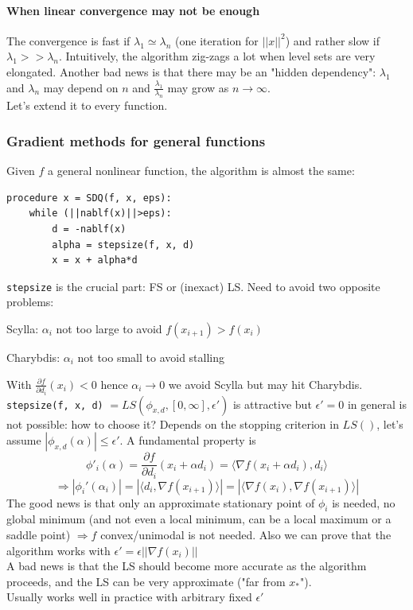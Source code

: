 \documentclass[10pt]{report}
\begin{document}
\paragraph{When linear convergence may not be enough} The convergence is fast if $\lambda_1\simeq \lambda_n$ (one iteration for $||x||^2$) and rather slow if $\lambda_1 >> \lambda_n$. Intuitively, the algorithm zig-zags a lot when level sets are very elongated. Another bad news is that there may be an "hidden dependency": $\lambda_1$ and $\lambda_n$ may depend on $n$ and $\frac{\lambda_1}{\lambda_n}$ may grow as $n\rightarrow\infty$.\\
Let's extend it to every function.
\subsubsection{Gradient methods for general functions}
Given $f$ a general nonlinear function, the algorithm is almost the same:
\begin{lstlisting}[style=myPython]
procedure x = SDQ(f, x, eps):
	while (||nablf(x)||>eps):
		d = -nablf(x)
		alpha = stepsize(f, x, d)
		x = x + alpha*d
\end{lstlisting}
\texttt{stepsize} is the crucial part: FS or (inexact) LS. Need to avoid two opposite problems:
\begin{list}{}{}
	\item Scylla: $\alpha_i$ not too large to avoid $f(x_{i+1}) > f(x_i)$
	\item Charybdis: $\alpha_i$ not too small to avoid stalling
\end{list}
With $\frac{\partial f}{\partial d_i}(x_i)<0$ hence $\alpha_i\rightarrow 0$ we avoid Scylla but may hit Charybdis.\\
\texttt{stepsize(f, x, d)} $= LS(\phi_{x,d}, [0,\infty], \epsilon')$ is attractive but $\epsilon' = 0$ in general is not possible: how to choose it? Depends on the stopping criterion in $LS()$, let's assume $|\phi_{x,d}(\alpha)| \leq \epsilon'$. A fundamental property is $$\phi'_i(\alpha) = \frac{\partial f}{\partial d_i}(x_i + \alpha d_i) = \langle\nabla f(x_i+\alpha d_i), d_i\rangle$$
$$\Rightarrow |\phi_i'(\alpha_i)| = |\langle d_i, \nabla f(x_{i+1})\rangle| = |\langle \nabla f(x_i),\nabla f(x_{i+1})\rangle|$$
The good news is that only an approximate stationary point of $\phi_i$ is needed, no global minimum (and not even a local minimum, can be a local maximum or a saddle point) $\Rightarrow f$ convex/unimodal is not needed. Also we can prove that the algorithm works with $\epsilon' = \epsilon ||\nabla f(x_i)||$\\
A bad news is that the LS should become more accurate as the algorithm proceeds, and the LS can be very approximate ("far from $x_*$").\\
Usually works well in practice with arbitrary fixed $\epsilon'$
\end{document}
